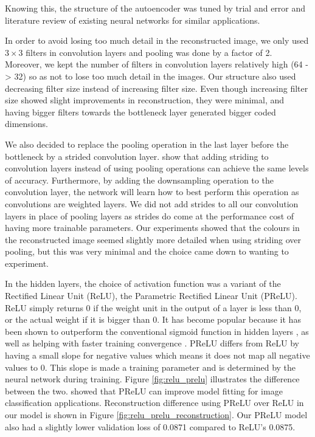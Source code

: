 Knowing this, the structure of the autoencoder was tuned by trial and error and literature review of existing neural networks for similar applications.

In order to avoid losing too much detail in the reconstructed image, we only used $3\times3$ filters in convolution layers and pooling was done by a factor of 2. Moreover, we kept the number of filters in convolution layers relatively high (64 -> 32) so as not to lose too much detail in the images. Our structure also used decreasing filter size instead of increasing filter size. Even though increasing filter size showed slight improvements in reconstruction, they were minimal, and having bigger filters towards the bottleneck layer generated bigger coded dimensions.

We also decided to replace the pooling operation in the last layer before the bottleneck by a strided convolution layer. \citet{springenberg_striving_2014} show that adding striding to convolution layers instead of using pooling operations can achieve the same levels of accuracy. Furthermore, by adding the downsampling operation to the convolution layer, the network will learn how to best perform this operation as convolutions are weighted layers. We did not add strides to all our convolution layers in place of pooling layers as strides do come at the performance cost of having more trainable parameters. Our experiments showed that the colours in the reconstructed image seemed slightly more detailed when using striding over pooling, but this was very minimal and the choice came down to wanting to experiment.

In the hidden layers, the choice of activation function was a variant of the Rectified Linear Unit (ReLU), the Parametric Rectified Linear Unit (PReLU). ReLU simply returns 0 if the weight unit in the output of a layer is less than 0, or the actual weight if it is bigger than 0. It has become popular because it has been shown to outperform the conventional sigmoid function in hidden layers \citep{hinton_relu, glorot2011}, as well as helping with faster training convergence \citep{krizhevsky_imagenet_2012}. PReLU differs from ReLU by having a small slope for negative values which means it does not map all negative values to 0. This slope is made a training parameter and is determined by the neural network during training. Figure \ref{fig:relu_prelu} illustrates the difference between the two. \citet{he_2015} showed that PReLU can improve model fitting for image classification applications. Reconstruction difference using PReLU over ReLU in our model is shown in Figure \ref{fig:relu_prelu_reconstruction}. Our PReLU model also had a slightly lower validation loss of 0.0871 compared to ReLU's 0.0875.

